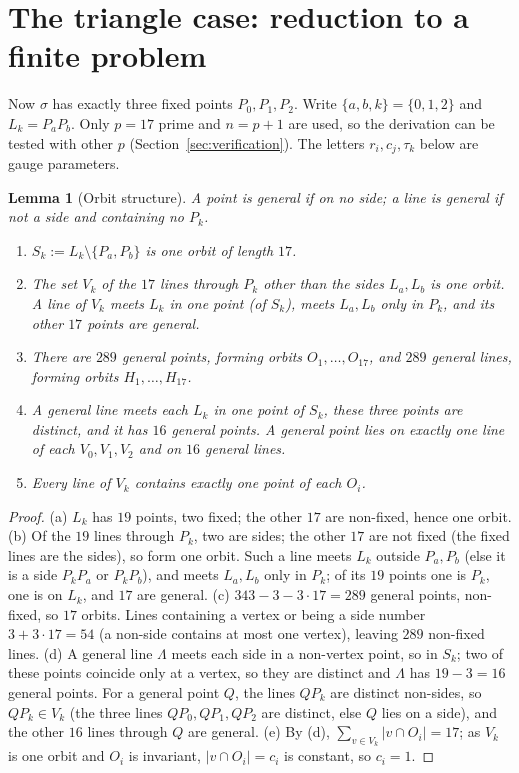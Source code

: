 \documentclass[11pt,a4paper]{article}
\newtheorem{lemma}[theorem]{Lemma}
\theoremstyle{definition}
\begin{document}
\section{The triangle case: reduction to a finite problem}\label{sec:triangle}

Now $\sigma$ has exactly three fixed points $P_0,P_1,P_2$. Write $\{a,b,k\}=\{0,1,2\}$ and $L_k=P_aP_b$. Only $p=17$ prime and $n=p+1$ are used, so the derivation can be tested with other $p$ (Section~\ref{sec:verification}). The letters $r_i,c_j,\tau_k$ below are gauge parameters.

\begin{lemma}[Orbit structure]\label{lem:orbstruct}
A point is \emph{general} if on no side; a line is \emph{general} if not a side and containing no $P_k$.
\begin{enumerate}[label=(\alph*),itemsep=0pt]
\item $S_k:=L_k\setminus\{P_a,P_b\}$ is one orbit of length $17$.
\item The set $V_k$ of the $17$ lines through $P_k$ other than the sides $L_a,L_b$ is one orbit. A line of $V_k$ meets $L_k$ in one point (of $S_k$), meets $L_a,L_b$ only in $P_k$, and its other $17$ points are general.
\item There are $289$ general points, forming orbits $O_1,\dots,O_{17}$, and $289$ general lines, forming orbits $H_1,\dots,H_{17}$.
\item A general line meets each $L_k$ in one point of $S_k$, these three points are distinct, and it has $16$ general points. A general point lies on exactly one line of each $V_0,V_1,V_2$ and on $16$ general lines.
\item Every line of $V_k$ contains exactly one point of each $O_i$.
\end{enumerate}
\end{lemma}
\begin{proof}
(a) $L_k$ has $19$ points, two fixed; the other $17$ are non-fixed, hence one orbit.
(b) Of the $19$ lines through $P_k$, two are sides; the other $17$ are not fixed (the fixed lines are the sides), so form one orbit. Such a line meets $L_k$ outside $P_a,P_b$ (else it is a side $P_kP_a$ or $P_kP_b$), and meets $L_a,L_b$ only in $P_k$; of its $19$ points one is $P_k$, one is on $L_k$, and $17$ are general.
(c) $343-3-3\cdot17=289$ general points, non-fixed, so $17$ orbits. Lines containing a vertex or being a side number $3+3\cdot17=54$ (a non-side contains at most one vertex), leaving $289$ non-fixed lines.
(d) A general line $\Lambda$ meets each side in a non-vertex point, so in $S_k$; two of these points coincide only at a vertex, so they are distinct and $\Lambda$ has $19-3=16$ general points. For a general point $Q$, the lines $QP_k$ are distinct non-sides, so $QP_k\in V_k$ (the three lines $QP_0,QP_1,QP_2$ are distinct, else $Q$ lies on a side), and the other $16$ lines through $Q$ are general.
(e) By (d), $\sum_{v\in V_k}|v\cap O_i|=17$; as $V_k$ is one orbit and $O_i$ is invariant, $|v\cap O_i|=c_i$ is constant, so $c_i=1$.
\end{proof}
\end{document}
